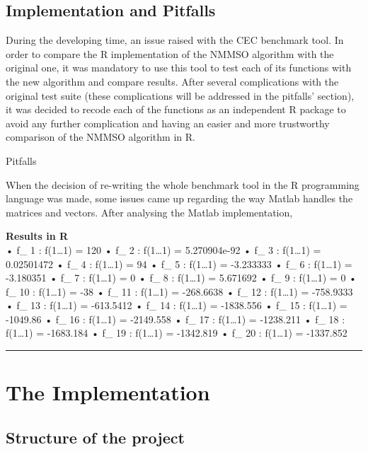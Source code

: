 \documentclass[12pt,a4paper]{article}
\begin{document}
\subsection{Implementation and
Pitfalls}\label{implementation-and-pitfalls}

During the developing time, an issue raised with the CEC benchmark tool.
In order to compare the R implementation of the NMMSO algorithm with the
original one, it was mandatory to use this tool to test each of its
functions with the new algorithm and compare results. After several
complications with the original test suite (these complications will be
addressed in the pitfalls' section), it was decided to recode each of
the functions as an independent R package to avoid any further
complication and having an easier and more trustworthy comparison of the
NMMSO algorithm in R.

Pitfalls

When the decision of re-writing the whole benchmark tool in the R
programming language was made, some issues came up regarding the way
Matlab handles the matrices and vectors. After analysing the Matlab
implementation,

\textbf{Results in R}\\
 • f\_ 1 : f(1\ldots{}1) = 120 • f\_ 2 : f(1\ldots{}1) = 5.270904e-92 •
f\_ 3 : f(1\ldots{}1) = 0.02501472 • f\_ 4 : f(1\ldots{}1) = 94 • f\_ 5
: f(1\ldots{}1) = -3.233333 • f\_ 6 : f(1\ldots{}1) = -3.180351 • f\_ 7
: f(1\ldots{}1) = 0 • f\_ 8 : f(1\ldots{}1) = 5.671692 • f\_ 9 :
f(1\ldots{}1) = 0 • f\_ 10 : f(1\ldots{}1) = -38 • f\_ 11 :
f(1\ldots{}1) = -268.6638 • f\_ 12 : f(1\ldots{}1) = -758.9333 • f\_ 13
: f(1\ldots{}1) = -613.5412 • f\_ 14 : f(1\ldots{}1) = -1838.556 • f\_
15 : f(1\ldots{}1) = -1049.86 • f\_ 16 : f(1\ldots{}1) = -2149.558 • f\_
17 : f(1\ldots{}1) = -1238.211 • f\_ 18 : f(1\ldots{}1) = -1683.184 •
f\_ 19 : f(1\ldots{}1) = -1342.819 • f\_ 20 : f(1\ldots{}1) = -1337.852

\begin{center}\rule{0.5\linewidth}{\linethickness}\end{center}

\section{The Implementation}\label{the-implementation}

\subsection{Structure of the project}\label{structure-of-the-project}
\end{document}

